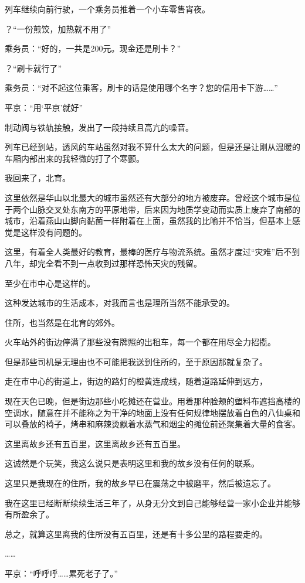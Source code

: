 列车继续向前行驶，一个乘务员推着一个小车零售宵夜。

？“一份煎饺，加热就不用了”

乘务员：“好的，一共是200元。现金还是刷卡？”

？“刷卡就行了”

乘务员：“对不起这位乘客，刷卡的话是使用哪个名字？您的信用卡下游……”

平京：“用‘平京’就好”

制动阀与铁轨接触，发出了一段持续且高亢的噪音。

列车已经到站，透风的车站虽然对我不算什么太大的问题，但是还是让刚从温暖的车厢内部出来的我轻微的打了个寒颤。

我回来了，北育。

这里依然是华山以北最大的城市虽然还有大部分的地方被废弃。曾经这个城市是位于两个山脉交叉处东南方的平原地带，后来因为地质学变动而实质上废弃了南部的城市，沿着燕山山脚向黏菌一样附着在上面，虽然我的比喻并不恰当，但基本上感觉是这样没有问题的。

这里，有着全人类最好的教育，最棒的医疗与物流系统。虽然才度过“灾难”后不到八年，却完全看不到一点收到过那样恐怖天灾的残留。

至少在市中心是这样的。

这种发达城市的生活成本，对我而言也是理所当然不能承受的。

住所，也当然是在北育的郊外。

火车站外的街边停满了那些没有牌照的出租车，每一个都在用尽全力招揽。

但是那些司机是无理由也不可能把我送到住所的，至于原因那就复杂了。

走在市中心的街道上，街边的路灯的橙黄连成线，随着道路延伸到远方，

现在天色已晚，但是街边那些小吃摊还在营业。用着那种脸颊的塑料布遮挡高楼的空调水，随意在并不能称之为干净的地面上没有任何规律地摆放着白色的八仙桌和可以叠放的椅子，烤串和麻辣烫飘着水蒸气和烟尘的摊位前还聚集着大量的食客。

这里离故乡还有五百里，这里离故乡还有五百里。

这诚然是个玩笑，我这么说只是表明这里和我的故乡没有任何的联系。

这里只是我现在的住所，我的故乡早已在震荡之中被磨平，然后被遗忘了。

我在这里已经断断续续生活三年了，从身无分文到自己能够经营一家小企业并能够有所盈余了。

总之，就算这里离我的住所没有五百里，还是有十多公里的路程要走的。

……

平京：“呼呼呼……累死老子了。”

